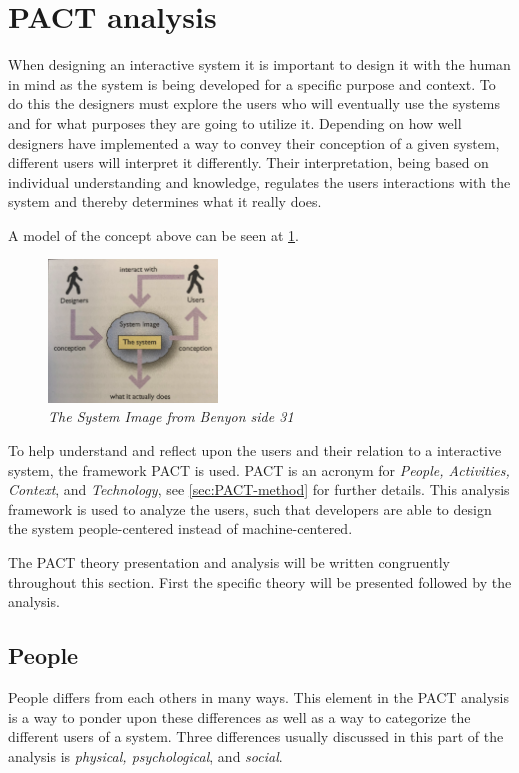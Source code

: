 \section{PACT analysis}\label{sec:PACT}
When designing an interactive system it is important to design it with the human in mind as the system is being developed for a specific purpose and context.
To do this the designers must explore the users who will eventually use the systems and for what purposes they are going to utilize it. 
Depending on how well designers have implemented a way to convey their conception of a given system, different users will interpret it differently. 
Their interpretation, being based on individual understanding and knowledge, regulates the users interactions with the system and thereby determines what it really does.
\citep{Benyon}

A model of the concept above can be seen at \cref{fig:PACT-SystemImage}.

\begin{figure}[H]
	\centering
	\includegraphics[width=0.4\textwidth]{billeder/SystemImage-Benyon.png}
	\caption{\textit{The System Image from {\color{red}Benyon side 31}}}
	\label{fig:PACT-SystemImage}
\end{figure}

To help understand and reflect upon the users and their relation to a interactive system, the framework PACT is used. 
PACT is an acronym for \textit{People, Activities, Context}, and \textit{Technology}, see \cref{sec:PACT-method} for further details.
This analysis framework is used to analyze the users, such that developers are able to design the system people-centered instead of machine-centered.
\citep{Benyon}

The PACT theory presentation and analysis will be written congruently throughout this section. First the specific theory will be presented followed by the analysis.

\subsection{People}
People differs from each others in many ways.
This element in the PACT analysis is a way to ponder upon these differences as well as a way to categorize the different users of a system. 
Three differences usually discussed in this part of the analysis is \textit{physical, psychological}, and \textit{social}. \citep{Benyon}

